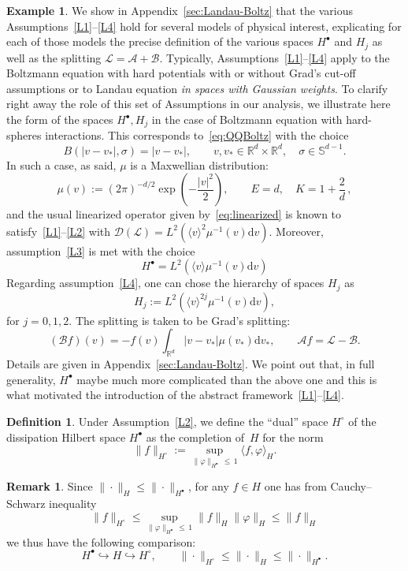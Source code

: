 \documentclass[10pt]{amsart}
\theoremstyle{definition}\newtheorem{defi}[theo]{Definition}\newtheorem{rema}[theo]{Remark}\newtheorem{exam}[theo]{Example}\newtheorem{exem}[theo]{Example}\newtheorem{nota}[theo]{Notation}
\renewcommand{\d}{\mathrm{d}}
\newcommand{\R}{\mathbb{R}}
\renewcommand{\S}{\mathbb{S}}
\renewcommand{\AA}{\mathcal{A}}
\newcommand{\BB}{\mathcal{B}}
\newcommand{\LL}{\mathcal{L}}
\newcommand{\dom}{\mathscr{D}}
\newcommand{\Ss}{H}
\newcommand{\Ssp}{H^{\bullet}}
\newcommand{\Ssm}{H^{\circ}}
\renewcommand*\le{\leqslant}
\renewcommand*\leq{\leqslant}
\newcommand{\la}{\langle}
\newcommand{\ra}{\rangle}
\begin{document}
\begin{exem}\label{rem:L1B1}
We show in Appendix~\ref{sec:Landau-Boltz} that the various Assumptions~\eqref{L1}--\eqref{L4} hold for several models of physical interest, explicating for each of those models the precise definition of the various spaces $\Ssp$ and $\Ss_{j}$ as well as the splitting $\LL=\AA+\BB$. {Typically, Assumptions~\eqref{L1}--\eqref{L4} apply to the Boltzmann equation with hard potentials with or without Grad's cut-off assumptions or to Landau equation \emph{in spaces with Gaussian weights}.} To clarify right away the role of this set of Assumptions in our analysis, we illustrate here the form of the spaces $\Ssp,\Ss_{j}$ in the case of Boltzmann equation with hard-spheres interactions. This corresponds to~\eqref{eq:QQBoltz} with the choice
\[
B(|v-v_{*}|,\sigma)=|v-v_{*}|, \qquad v,v_{*} \in \R^{d}\times\R^{d}, \quad \sigma \in \S^{d-1}.
\]
In such a case, as said, $\mu$ is a Maxwellian distribution:
\begin{equation}\label{eq:muMax}
\mu(v) := (2 \pi)^{-d/2} \exp\left(- \frac{|v|^2}{2} \right), \qquad E = d, \quad K = 1 + \frac{2}{d} \,,
\end{equation}
and the usual linearized operator given by~\eqref{eq:linearized} is known to satisfy~\eqref{L1}--\eqref{L2} with $\dom(\LL)=L^2(\langle v\rangle^2\mu^{-1}(v)\d v)$. Moreover, assumption~\eqref{L3} is met with the choice
\[
\Ssp=L^2\left(\la v\ra \mu^{-1}(v)\d v\right)
\]
Regarding assumption~\eqref{L4}, one can chose the hierarchy of spaces $\Ss_{j}$ as
\[
\Ss_j := L^2\left(\la v \ra^{2 j} \mu^{-1}(v) \d v \right),
\]
for $j=0,1,2$. The splitting is taken to be Grad's splitting:
\[
(\BB f)(v) = - f(v) \int_{\R^d} |v-v_*| \mu(v_*) \d v_*, \qquad \AA f = \LL - \BB.
\]
Details are given in Appendix~\ref{sec:Landau-Boltz}. We point out that, in full generality, $\Ssp$ maybe much more complicated than the above one and this is what motivated the introduction of the abstract framework~\eqref{L1}--\eqref{L4}.
\end{exem}

\begin{defi}\label{defi:Hhstar}
Under Assumption~\eqref{L2}, we define the ``dual'' space $\Ssm$ of the dissipation Hilbert space $\Ssp$ as the completion of~$\Ss$ for the norm
\[
\| f \|_{\Ssm} := \sup_{ \| \varphi \|_{\Ssp}\,\le\,1} \la f, \varphi \ra_{\Ss}.
\]
\end{defi}

\begin{rema}\label{rem:rangHh}
Since $\|\cdot\|_{\Ss} \leq \|\cdot\|_{\Ssp}$, for any $f \in\Ss$ one has from Cauchy--Schwarz inequality
\[
\|f\|_{\Ssm} \le \sup_{\|\varphi\|_{\Ssp}\,\leq\,1} \|f\|_{\Ss}\|\varphi\|_{\Ss} \le \|f\|_{\Ss}
\]
we thus have the following comparison:
\[
\Ssp \hookrightarrow \Ss \hookrightarrow \Ssm, \qquad \|\cdot\|_{\Ssm} \leq \|\cdot\|_{\Ss} \leq \|\cdot\|_{\Ssp}.
\]
\end{rema}
\end{document}
